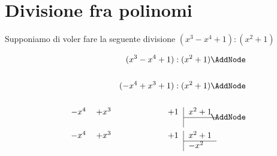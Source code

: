 \section{Divisione fra polinomi}
\begin{esempiot}{}{}
Supponiamo di voler fare la seguente divisione $(x^3-x^4+1):(x^2+1)$
\end{esempiot}
\begin{NodesList}
\begin{align*}
(x^3-x^4+1):(x^2+1)&\AddNode\\
&\\
(-x^4+x^3+1):(x^2+1)&\AddNode\\
&\\
\begin{minipage}[t]{0.5\textwidth}
\begin{tabular}{lllll|l}
$-x^4$& $+x^3$ & \phantom{$-x^2$} &\phantom{$-x$}  &$+1$&$ x^2+1$\\ 
\cline{6-6}&&&&&
\\
\end{tabular}
\end{minipage}&\AddNode\\
\begin{minipage}[t]{0.5\textwidth}
\begin{tabular}{lllll|l}
$-x^4$& $+x^3$ &\phantom{$-x^2$}  &\phantom{$-x$}  &$+1$&$ x^2+1$\\ 
\cline{6-6}&&&&&$-x^2$

\end{tabular}
\end{minipage}
\end{align*}
\end{NodesList}
